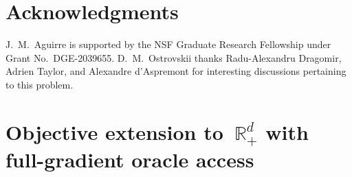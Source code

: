 \documentclass[11pt]{article}
\numberwithin{equation}{section}
\theoremstyle{remark}
\newcommand{\R}{\mathbb{R}}
\newcommand{\1}{\mathbf{1}}
\begin{document}
\section*{Acknowledgments}

J.~M.~Aguirre is supported by the NSF Graduate Research Fellowship under Grant No.~DGE-2039655.
D.~M.~Ostrovskii thanks Radu-Alexandru Dragomir, Adrien Taylor, and Alexandre d'Aspremont for interesting discussions pertaining to this problem.
%
\appendix
\section{Objective extension to~$\R^d_+$ with full-gradient oracle access}
\label{app:conic}
\end{document}
